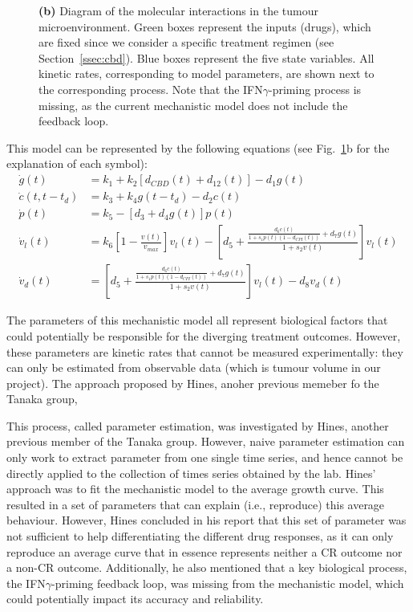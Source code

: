 \documentclass[11pt]{article}
\begin{document}
\begin{figure}[!ht]
{    \textbf{(b)} Diagram of the molecular interactions in the tumour microenvironment. Green boxes represent the inputs (drugs), which are fixed since we consider a specific treatment regimen (see Section~\ref{ssec:cbd}). Blue boxes represent the five state variables. All kinetic rates, corresponding to model parameters, are shown next to the corresponding process. Note that the IFN$\gamma$-priming process is missing, as the current mechanistic model does not include the feedback loop.}
    \label{fig:mech}
\end{figure}

This model can be represented by the following equations \cite{takuya} (see Fig.~\ref{fig:mech}b for the explanation of each symbol): 
\begin{align*}
    \dot{g}(t) &= k_1 + k_2 [d_{CBD}(t) + d_{12}(t)] - d_1g(t) \\ 
    \dot{c}(t,t-t_d) &= k_3 + k_4g(t-t_d)-d_2c(t) \\ 
    \dot{p}(t) &= k_5 - [d_3 + d_4g(t)]p(t) \\ 
    \dot{v}_l(t) &= k_6\left[1 - \frac{v(t)}{v_{max}} \right]v_l(t) - \left[d_5 + \frac{\frac{d_6c(t)}{1+s_1p(t)(1-d_{CPI}(t))}+d_7g(t)}{1+s_2v(t)}\right]v_l(t)\\
    \dot{v}_d(t) &= \left[d_5 + \frac{\frac{d_6c(t)}{1+s_1p(t)(1-d_{CPI}(t))}+d_7g(t)}{1+s_2v(t)}\right]v_l(t) - d_8 v_d(t)
\end{align*}

The parameters of this mechanistic model all represent biological factors that could potentially be responsible for the diverging treatment outcomes. However, these parameters are kinetic rates that cannot be measured experimentally: they can only be estimated from observable data (which is tumour volume in our project). The approach proposed by Hines, anoher previous memeber fo the Tanaka group, 

This process, called parameter estimation, was investigated by Hines, another previous member of the Tanaka group. However, naive parameter estimation can only work to extract parameter from one single time series, and hence cannot be directly applied to the collection of times series obtained by the lab. Hines' approach was to fit the mechanistic model to the average growth curve. This resulted in a set of parameters that can explain (i.e., reproduce) this average behaviour. However, Hines concluded in his report that this set of parameter was not sufficient to help differentiating the different drug responses, as it can only reproduce an average curve that in essence represents neither a CR outcome nor a non-CR outcome. Additionally, he also mentioned that a key biological process, the IFN$\gamma$-priming feedback loop, was missing from the mechanistic model, which could potentially impact its accuracy and reliability.
\end{document}
